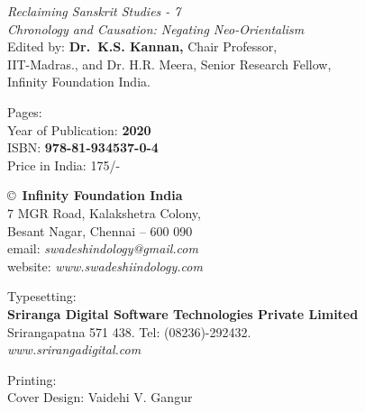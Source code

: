 \thispagestyle{empty}

\noindent
{\fontsize{9}{11}\selectfont\sl Reclaiming Sanskrit Studies - 7}\\
\textit{Chronology and Causation: Negating Neo-Orientalism}\\
Edited by: {\bf Dr.\ K.S. Kannan,} Chair Professor,\\
IIT-Madras., and Dr. H.R. Meera, Senior Research Fellow,\\
 Infinity Foundation India.\\
\vfill

\noindent
Pages: {\bf\pageref{bookend}}\\
Year of Publication: {\bf 2020}\\
ISBN: {\bf 978-81-934537-0-4}\\
Price in India: 175/-
\vfill

\noindent
\copyright\ {\bf Infinity Foundation India}\\ 
7 MGR Road, Kalakshetra Colony,\\ 
Besant Nagar, Chennai -- 600 090\\
email: {\sl swadeshindology@gmail.com}\\
website: {\sl www.swadeshiindology.com} 
\vfill

\noindent
Typesetting:\\ 
{\bf Sriranga Digital Software Technologies Private Limited}\\ 
Srirangapatna 571 438. Tel: (08236)-292432.\\
{\sl www.srirangadigital.com}
\vfill

\noindent
Printing:\\

\noindent
Cover Design: Vaidehi V. Gangur\\ 
